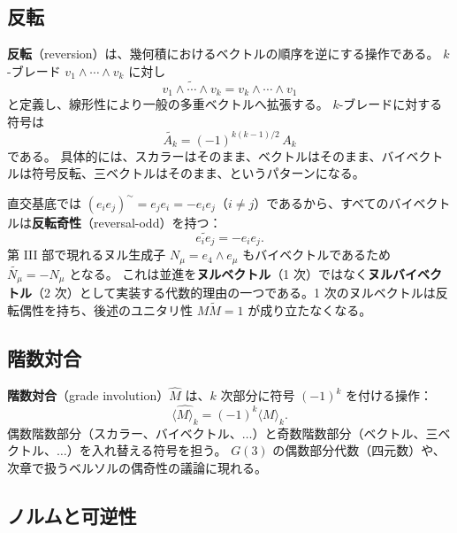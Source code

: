 \documentclass[dvipdfmx,a4paper,oneside]{jsbook}
\numberwithin{equation}{chapter}
\begin{document}
\subsection{反転}

\textbf{反転}（reversion）は、幾何積におけるベクトルの順序を逆にする操作である。
\(k\)-ブレード \(v_1\wedge\cdots\wedge v_k\) に対し
\begin{equation}
  \widetilde{v_1 \wedge \cdots \wedge v_k} = v_k \wedge \cdots \wedge v_1
  \label{eq:reversion-blade}
\end{equation}
と定義し、線形性により一般の多重ベクトルへ拡張する。
\(k\)-ブレードに対する符号は
\begin{equation}
  \widetilde{A_k} = (-1)^{k(k-1)/2}\,A_k
  \label{eq:reversion-sign}
\end{equation}
である。
具体的には、スカラーはそのまま、ベクトルはそのまま、バイベクトルは符号反転、三ベクトルはそのまま、というパターンになる。

直交基底では \((e_i e_j)^{\sim} = e_j e_i = -e_i e_j\)（\(i\neq j\)）であるから、すべてのバイベクトルは\textbf{反転奇性}（reversal-odd）を持つ：
\begin{equation}
  \widetilde{e_i e_j} = -e_i e_j.
  \label{eq:biv-rev-odd}
\end{equation}
第 III 部で現れるヌル生成子 \(N_\mu = e_4\wedge e_\mu\) もバイベクトルであるため \(\widetilde{N_\mu} = -N_\mu\) となる。
これは並進を\textbf{ヌルベクトル}（1 次）ではなく\textbf{ヌルバイベクトル}（2 次）として実装する代数的理由の一つである。1 次のヌルベクトルは反転偶性を持ち、後述のユニタリ性 \(M\widetilde{M}=1\) が成り立たなくなる。

\subsection{階数対合}

\textbf{階数対合}（grade involution）\(\widehat{M}\) は、\(k\) 次部分に符号 \((-1)^k\) を付ける操作：
\begin{equation}
  \widehat{\langle M \rangle_k} = (-1)^k \langle M \rangle_k.
  \label{eq:grade-involution}
\end{equation}
偶数階数部分（スカラー、バイベクトル、\(\ldots\)）と奇数階数部分（ベクトル、三ベクトル、\(\ldots\)）を入れ替える符号を担う。
\(G(3)\) の偶数部分代数（四元数）や、次章で扱うベルソルの偶奇性の議論に現れる。

\subsection{ノルムと可逆性}
\end{document}
